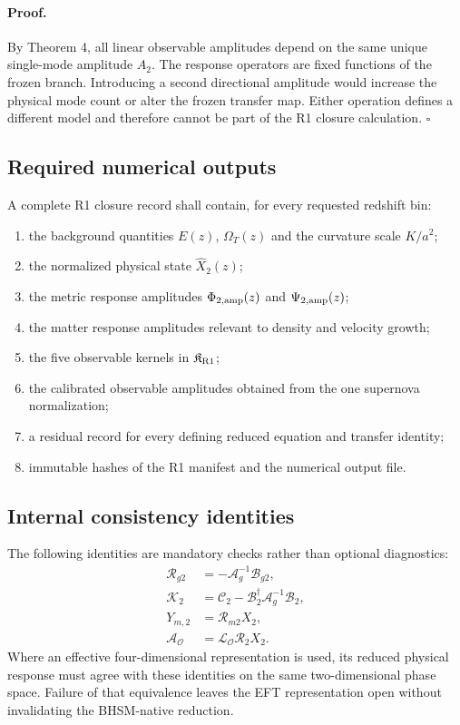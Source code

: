 \paragraph{Proof.}
By Theorem 4, all linear observable amplitudes depend on the same unique
single-mode amplitude $A_2$.  The response operators are fixed functions of
the frozen branch.  Introducing a second directional amplitude would increase
the physical mode count or alter the frozen transfer map.  Either operation
defines a different model and therefore cannot be part of the R1 closure
calculation. \hfill$\square$

\subsection{Required numerical outputs}

A complete R1 closure record shall contain, for every requested redshift bin:

\begin{enumerate}
\item the background quantities $E(z)$, $\Omega_T(z)$ and the curvature
      scale $K/a^2$;
\item the normalized physical state $\widehat X_2(z)$;
\item the metric response amplitudes
      $\Phi_{2,\rm amp}(z)$ and $\Psi_{2,\rm amp}(z)$;
\item the matter response amplitudes relevant to density and velocity growth;
\item the five observable kernels in $\mathfrak K_{\rm R1}$;
\item the calibrated observable amplitudes obtained from the one supernova
      normalization;
\item a residual record for every defining reduced equation and transfer
      identity;
\item immutable hashes of the R1 manifest and the numerical output file.
\end{enumerate}

\subsection{Internal consistency identities}

The following identities are mandatory checks rather than optional
diagnostics:
\begin{align}
\mathcal R_{g2}
&=
-\mathcal A_g^{-1}\mathcal B_{g2},
\\
\mathcal K_2
&=
\mathcal C_2
-
\mathcal B_2^\dagger\mathcal A_g^{-1}\mathcal B_2,
\\
Y_{m,2}
&=
\mathcal R_{m2}X_2,
\\
\mathcal A_{\mathcal O}
&=
\mathcal L_{\mathcal O}\mathcal R_2 X_2.
\end{align}
Where an effective four-dimensional representation is used, its reduced
physical response must agree with these identities on the same two-dimensional
phase space.  Failure of that equivalence leaves the EFT representation open
without invalidating the BHSM-native reduction.

